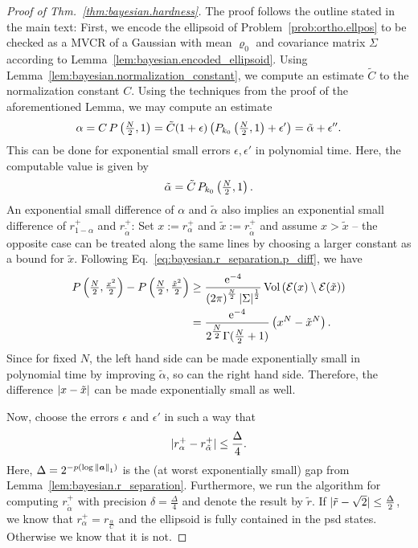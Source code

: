 \begin{proof}[Proof of Thm.~\ref{thm:bayesian.hardness}]
  The proof follows the outline stated in the main text:
  First, we encode the ellipsoid of Problem~\ref{prob:ortho.ellpos} to be checked as a MVCR of a Gaussian with mean $\varrho_0$ and covariance matrix $\Sigma$ according to Lemma~\ref{lem:bayesian.encoded_ellipsoid}.
  Using Lemma~\ref{lem:bayesian.normalization_constant}, we compute an estimate $\tilde C$ to the normalization constant $C$.
  Using the techniques from the proof of the aforementioned Lemma, we may compute an estimate
  \[
    \alpha = C \, P\left( \tfrac{N}{2}, 1 \right) = \tilde C (1 + \epsilon) \left( P_{k_0}\left( \tfrac{N}{2}, 1 \right) + \epsilon' \right) = \tilde\alpha + \epsilon''.
  \]
  This can be done for exponential small errors $\epsilon, \epsilon'$ in polynomial time.
  Here, the computable value is given by
  \[
    \tilde\alpha = \tilde C \, P_{k_0}\left(\tfrac{N}{2}, 1 \right).
  \]
  An exponential small difference of $\alpha$ and $\tilde\alpha$ also implies an exponential small difference of $r^+_{1-\alpha}$ and $r^+_{\tilde\alpha}$:
  Set $x := r^+_{\alpha}$ and $\tilde x := r^+_{\tilde\alpha}$ and assume $x > \tilde x$ -- the opposite case can be treated along the same lines by choosing a larger constant as a bound for $\tilde x$.
  Following Eq.~\eqref{eq:bayesian.r_separation.p_diff}, we have
  \begin{align*}
    P\left( \tfrac{N}{2}, \tfrac{x^2}{2} \right) - P\left( \tfrac{N}{2}, \tfrac{{\tilde x}^2}{2} \right)
    &\ge \frac{\mathrm{e}^{-4}}{{(2\pi)}^{\frac{N}{2}} \, {\vert\Sigma\vert}^{\frac{1}{2}}} \, \mathrm{Vol}\left(  \mathcal{E}(x) \setminus \mathcal{E}(\tilde x)  \right) \\
    &= \frac{\mathrm{e}^{-4}}{2^{\tfrac{N}{2}} \Gamma(\tfrac{N}{2} + 1)} \left( x^N - {\tilde x}^N \right).
  \end{align*}
  Since for fixed $N$, the left hand side can be made exponentially small in polynomial time by improving $\tilde\alpha$, so can the right hand side.
  Therefore, the difference ${\vert x - \tilde x\vert}$ can be made exponentially small as well.


  Now, choose the errors $\epsilon$ and $\epsilon'$ in such a way that
  \[
    {\vert r^+_{\alpha} - r^+_{\tilde\alpha}\vert} \le \frac{\Delta}{4}.
  \]
  Here, $\Delta = 2^{-p(\log {\Vert{\boldsymbol{a}}\Vert}_1)}$ is the (at worst exponentially small) gap from Lemma~\ref{lem:bayesian.r_separation}.
  Furthermore, we run the algorithm for computing $r^+_{\tilde\alpha}$ with precision $\delta = \frac{\Delta}{4}$ and denote the result by $\tilde r$.
  If ${\vert\tilde r - \sqrt{2}\vert} \le \frac{\Delta}{2}$, we know that $r^+_{\alpha} = r_\frac{\alpha}{C}$ and the ellipsoid is fully contained in the psd states.
  Otherwise we know that it is not.
\end{proof}

